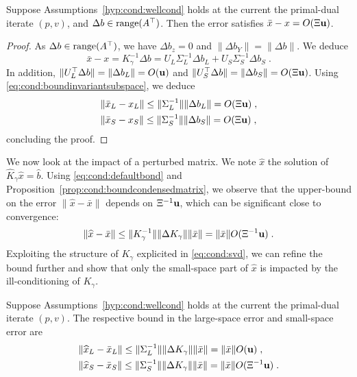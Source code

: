 \begin{proposition}
  \label{prop:cond:rhsperturb}
  Suppose Assumptions~\ref{hyp:cond:wellcond} holds at
  the current the primal-dual iterate $(p, v)$, and
  $\Delta b \in \operatorname{range}(A^\top)$. Then the
  error satisfies
  $\bar{x} - x = O(\Xi \mathbf{u})$.
\end{proposition}
\begin{proof}
  As $\Delta b \in \operatorname{range}(A^\top)$, we have $\Delta b_z = 0$
  and $\|\Delta b_Y \| = \|\Delta b \|$. We deduce
  \begin{equation}
    \bar{x} - x = K_\gamma^{-1} \Delta b =
    U_L \Sigma_L^{-1} \Delta b_L  +
    U_S \Sigma_S^{-1} \Delta b_S  \; .
  \end{equation}
  In addition, $\| U_L^\top \Delta b \| = \| \Delta b_L \| = O(\mathbf{u})$
and $\| U_S^\top \Delta b \| = \| \Delta b_S \| = O(\Xi \mathbf{u} )$.
  Using \eqref{eq:cond:boundinvariantsubspace}, we deduce
  \begin{equation}
    \begin{aligned}
    & \| \bar{x}_L - x_L \| \leq \|\Sigma_L^{-1} \|\|\Delta b_L \| = O(\Xi \mathbf{u}) \;, \\
    & \| \bar{x}_S - x_S \| \leq \|\Sigma_S^{-1} \|\|\Delta b_S \| = O(\Xi \mathbf{u}) \;,
    \end{aligned}
  \end{equation}
  concluding the proof.
\end{proof}
We now look at the impact of a perturbed matrix.
We note $\widehat{x}$ the solution of $\widehat{K}_\gamma \widehat{x} = \widehat{b}$.
Using \eqref{eq:cond:defaultbond} and Proposition~\ref{prop:cond:boundcondensedmatrix}, we observe
that the upper-bound on the error $\|\widehat{x} - \bar{x}\|$ depends on $\Xi^{-1} \mathbf{u}$,
which can be significant close to convergence:
\begin{equation}
  \| \widehat{x} - \bar{x} \| \leq \|K_\gamma^{-1} \| \|\Delta K_\gamma\| \| \bar{x} \|
  = \| \bar{x} \| O(\Xi^{-1} \mathbf{u}) \; .
\end{equation}
Exploiting the structure of $K_\gamma$ explicited in \eqref{eq:cond:svd},
we can refine the bound further and show that only the small-space
part of $\widehat{x}$ is impacted by the ill-conditioning of $K_\gamma$.
\begin{proposition}
  \label{prop:cond:matrixperturb}
  Suppose Assumptions~\ref{hyp:cond:wellcond} holds at
  the current the primal-dual iterate $(p, v)$.
  The respective bound in the large-space error
  and small-space error are
  \begin{equation}
    \begin{aligned}
    & \| \widehat{x}_L - \bar{x}_L  \| \leq \|\Sigma_L^{-1} \|\|\Delta K_\gamma \|\|\bar{x} \| = \| \bar{x} \| O(\mathbf{u}) \;, \\
    & \| \widehat{x}_S - \bar{x}_S  \| \leq \|\Sigma_S^{-1} \|\|\Delta K_\gamma \|\|\bar{x} \| = \| \bar{x} \| O(\Xi^{-1}\mathbf{u} ) \;.
    \end{aligned}
  \end{equation}

\end{proposition}
